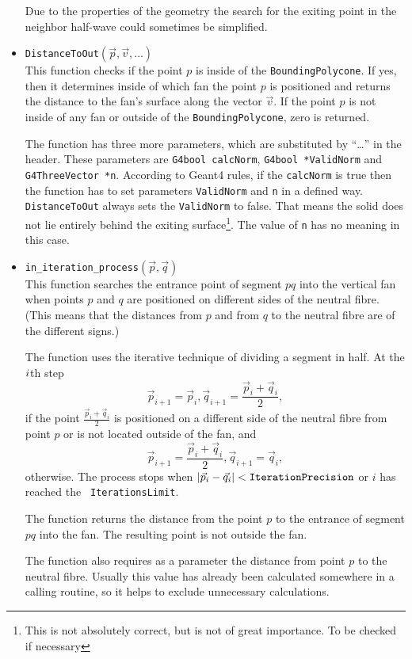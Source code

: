\documentclass{article}
\begin{document}
\begin{itemize}
Due to the properties of the geometry the search for the exiting point in the
neighbor half-wave could sometimes be simplified.

\item {\tt DistanceToOut$(\vec{p}, \vec{v}, \dots)$}\\
This function checks if the point $p$ is inside of the {\tt BoundingPolycone}. If
yes, then it determines inside of which fan the point $p$ is positioned and
returns the distance to the fan's surface along the vector $\vec{v}$. If the
point $p$ is not inside of any fan or outside of the
{\tt BoundingPolycone}, zero is returned.

The function has three more parameters, which are substituted by ``\dots'' in
the header. These parameters are {\tt G4bool calcNorm}, {\tt G4bool *ValidNorm}
and {\tt G4ThreeVector *n}. According to Geant4 rules, if the {\tt calcNorm} is
true then the function has to set parameters {\tt *ValidNorm} and
{\tt *n} in a defined way. {\tt DistanceToOut} always sets the {\tt *ValidNorm}
to false. That
means the solid does not lie entirely behind the exiting surface\footnote{This
is not absolutely correct, but is not of great importance. To be checked if
necessary}.
The value of {\tt *n} has no meaning in this case.

\item {\tt in\_iteration\_process$(\vec{p}, \vec{q})$}\\
This function searches the entrance point of segment $pq$ into the vertical
fan when points $p$ and $q$ are positioned on different
sides of the neutral fibre. (This means that the distances from $p$ and from $q$
to the neutral fibre are of the different signs.)

The function uses the iterative technique of dividing a segment in half. At the
$i\/$th step
\[\vec{p}_{i+1} = \vec{p}_i,  \vec{q}_{i+1} = \frac{\vec{p}_i+\vec{q}_i}{2},\]
if the point $\frac{\vec{p}_i+\vec{q}_i}{2}$ is positioned on a different
side of the neutral fibre from point $p$ or is not located outside of the 
fan, and
\[\vec{p}_{i+1} = \frac{\vec{p}_i+\vec{q}_i}{2}, \vec{q}_{i+1} = \vec{q}_i,\]
otherwise. The process stops when
$|\vec{p}_i-\vec{q}_i|<{\tt IterationPrecision\/}\/$ or $i$ has reached the {\tt
IterationsLimit\/}.

The function returns the distance from the point $p$ to the entrance
of segment $pq$ into the fan. The resulting point is not outside the fan.

The function also requires as a parameter the distance from point $p$ to the
neutral fibre. Usually this value has already been calculated somewhere in a
calling routine, so it helps to exclude unnecessary calculations.


\end{itemize}
\end{document}
